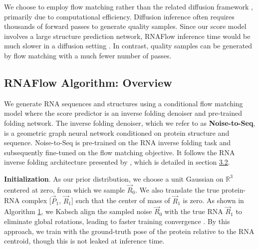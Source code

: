 We choose to employ flow matching rather than the related diffusion framework \cite{ho2020denoising}, primarily due to computational efficiency. Diffusion inference often requires thousands of forward passes to generate quality samples. Since our score model involves a large structure prediction network, RNAFlow inference time would be much slower in a diffusion setting \cite{yim2023fast}. In contrast, quality samples can be generated by flow matching with a much fewer number of passes. 

\subsection{RNAFlow Algorithm: Overview}

We generate RNA sequences and structures using a conditional flow matching model where the score predictor is an inverse folding denoiser and pre-trained folding network. The inverse folding denoiser, which we refer to as \textbf{Noise-to-Seq}, is a geometric graph neural network conditioned on protein structure and sequence. Noise-to-Seq is pre-trained on the RNA inverse folding task and subsequently fine-tuned on the flow matching objective. It follows the RNA inverse folding architecture presented by \citet{joshi2023multi}, which is detailed in section \hyperref[sec:3.2]{3.2}.

\textbf{Initialization}. As our prior distribution, we choose a unit Gaussian on $\mathbb{R}^3$ centered at zero, from which we sample $\vec R_0$. We also translate the true protein-RNA complex [$\vec P_1$, $\vec R_1$] such that the center of mass of $\vec R_1$ is zero. As shown in Algorithm \hyperref[rnaflow:train]{1}, we Kabsch align \cite{kabsch1976solution} the sampled noise $\vec R_0$ with the true RNA $\vec R_1$ to eliminate global rotations, leading to faster training convergence \cite{klein2023equivariant}. By this approach, we train with the ground-truth pose of the protein relative to the RNA centroid, though this is not leaked at inference time.

